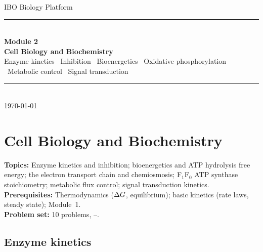 \documentclass[12pt, a4paper, oneside]{report}
\begin{document}
\begin{titlepage}
  \centering
  \vspace*{4cm}
  {\sffamily\fontsize{13}{16}\selectfont\color{accent} IBO Biology Platform}\\[0.6em]
  {\rule{0.4\textwidth}{0.4pt}}\\[0.6em]
  {\sffamily\fontsize{22}{28}\selectfont\bfseries Module 2}\\[0.4em]
  {\sffamily\fontsize{16}{20}\selectfont\bfseries\color{accent}
    Cell Biology and Biochemistry}\\[1.2em]
  {\small\color{gray}
    Enzyme kinetics \textbullet\ Inhibition \textbullet\
    Bioenergetics \textbullet\ Oxidative phosphorylation \textbullet\
    Metabolic control \textbullet\ Signal transduction}\\[0.6em]
  {\rule{0.4\textwidth}{0.4pt}}\\[0.5em]
  {\small\color{gray} \today}
\end{titlepage}

\tableofcontents
\newpage


\chapter{Cell Biology and Biochemistry}
\label{ch:cell_biochem}

\begin{tcolorbox}[colback=probback, colframe=accent, boxrule=0.5pt, arc=1pt,
  fonttitle=\bfseries\sffamily\small, coltitle=white, colbacktitle=accent,
  title={Module Overview}, top=4pt, bottom=4pt, left=6pt, right=6pt]
  \textbf{Topics:} Enzyme kinetics and inhibition;
  bioenergetics and ATP hydrolysis free energy;
  the electron transport chain and chemiosmosis;
  F$_1$F$_0$ ATP synthase stoichiometry;
  metabolic flux control; signal transduction kinetics.\\[3pt]
  \textbf{Prerequisites:} Thermodynamics ($\Delta G$, equilibrium);
  basic kinetics (rate laws, steady state); Module~1.\\[3pt]
  \textbf{Problem set:} 10 problems, \stars{2}--\stars{5}.
\end{tcolorbox}

\section{Enzyme kinetics}
\end{document}
